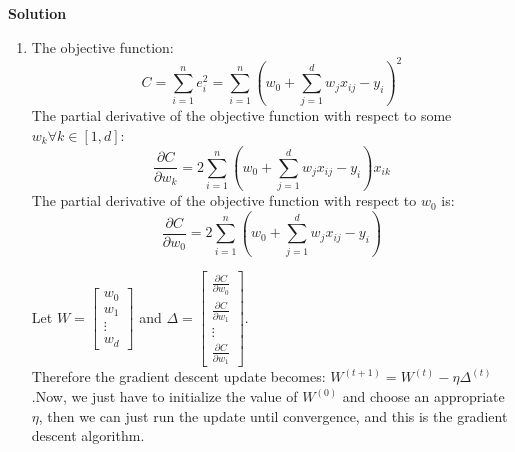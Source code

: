 \documentclass[twoside]{article}
\begin{document}
\textbf{Solution}
\begin{enumerate}
    \item 
    The objective function:
    \begin{equation*}
        C = \sum_{i=1}^n e_i^2 = \sum_{i=1}^n \left(w_0 + \sum_{j=1}^d w_j x_{ij} - y_i\right)^2
    \end{equation*}
    The partial derivative of the objective function with respect to some $w_k \forall k \in [1,d]$:
    \begin{equation*}
        \frac{\partial C}{\partial w_k} = 2\sum_{i=1}^n \left(w_0 + \sum_{j=1}^d w_j x_{ij} - y_i\right)x_{ik}
    \end{equation*}
    The partial derivative of the objective function with respect to $w_0$ is:
    \begin{equation*}
		\frac{\partial C}{\partial w_0} = 2\sum_{i=1}^n \left(w_0 + \sum_{j=1}^d w_j x_{ij} - y_i\right)
	\end{equation*}

    Let $W = \begin{bmatrix} w_0\\w_1\\ \vdots\\ w_d \end{bmatrix}$ and $\Delta = \begin{bmatrix} \frac{\partial C}{\partial w_0}\\\frac{\partial C}{\partial w_1}\\ \vdots\\ \frac{\partial C}{\partial w_1} \end{bmatrix}$.\\
    Therefore the gradient descent update becomes: $W^{(t+1)} = W^{(t)} - \eta \Delta ^ {(t)}$.Now, we just have to initialize the value of $W^{(0)}$ and choose an appropriate $\eta$, then we can just run the update until convergence, and this is the gradient descent algorithm.
    

\end{enumerate}
\end{document}

